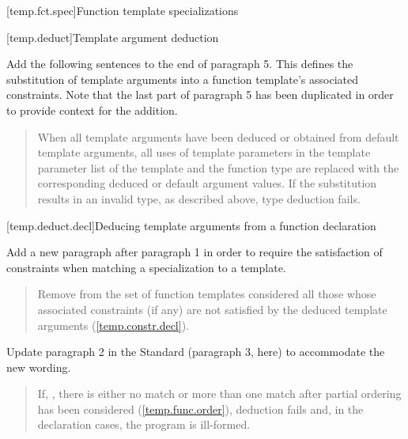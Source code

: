[temp.fct.spec]{Function template specializations}

\setcounter{subsection}{1}
[temp.deduct]{Template argument deduction}

Add the following sentences to the end of paragraph 5. This defines
the substitution of template arguments into a function template's
associated constraints. Note that the last part of paragraph 5
has been duplicated in order to provide context for the addition.

\begin{quote}
\setcounter{Paras}{4}
\pnum
When all template arguments have been deduced or obtained from default 
template arguments, all uses of template parameters in the template 
parameter list of the template and the function type are replaced with
the corresponding deduced or default argument values. 
% 
If the substitution results in an invalid type, as described above, type 
deduction fails.
% 
\end{quote}


\setcounter{subsubsection}{5}
[temp.deduct.decl]{Deducing template arguments from a function declaration}

Add a new paragraph after paragraph 1 in order to require the
satisfaction of constraints when matching a specialization to a
template.

\begin{quote}
\begin{addedblock}
\setcounter{Paras}{1}
\pnum
Remove from the set of function templates considered all those
whose associated constraints (if any) are not satisfied by the deduced
template arguments (\ref{temp.constr.decl}).
\end{addedblock}
\end{quote}

Update paragraph 2 in the \Cpp Standard (paragraph 3, here) to accommodate 
the new wording.

\begin{quote}
\pnum
If, 
,
there is either no match or more than one match after partial ordering 
has been considered (\ref{temp.func.order}), deduction fails 
and, in the declaration cases, the program is ill-formed.
\end{quote}


